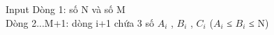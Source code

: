 Input  
Dòng 1: số N và số M   
\\   Dòng 2...M+1: dòng i+1 chứa 3 số $A_{i}$   , $B_{i}$   , $C_{i}$   ($A_{i}$   ≤ $B_{i}$   ≤ N)